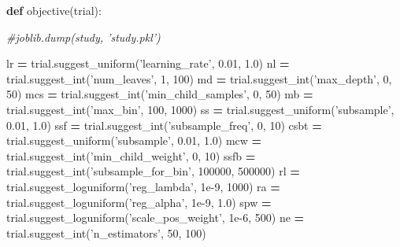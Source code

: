 \documentclass[]{book}
\newenvironment{Shaded}{\begin{snugshade}}{\end{snugshade}}
\newcommand{\CommentTok}[1]{\textcolor[rgb]{0.56,0.35,0.01}{\textit{#1}}}
\newcommand{\DecValTok}[1]{\textcolor[rgb]{0.00,0.00,0.81}{#1}}
\newcommand{\FloatTok}[1]{\textcolor[rgb]{0.00,0.00,0.81}{#1}}
\newcommand{\KeywordTok}[1]{\textcolor[rgb]{0.13,0.29,0.53}{\textbf{#1}}}
\newcommand{\NormalTok}[1]{#1}
\newcommand{\OperatorTok}[1]{\textcolor[rgb]{0.81,0.36,0.00}{\textbf{#1}}}
\newcommand{\StringTok}[1]{\textcolor[rgb]{0.31,0.60,0.02}{#1}}
\begin{document}
\begin{Shaded}
\begin{Highlighting}[]
\KeywordTok{def}\NormalTok{ objective(trial):    }
    
    \CommentTok{#joblib.dump(study, 'study.pkl')}
    
\NormalTok{    lr }\OperatorTok{=}\NormalTok{ trial.suggest_uniform(}\StringTok{'learning_rate'}\NormalTok{, }\FloatTok{0.01}\NormalTok{, }\FloatTok{1.0}\NormalTok{)}
\NormalTok{    nl }\OperatorTok{=}\NormalTok{ trial.suggest_int(}\StringTok{'num_leaves'}\NormalTok{, }\DecValTok{1}\NormalTok{, }\DecValTok{100}\NormalTok{) }
\NormalTok{    md }\OperatorTok{=}\NormalTok{ trial.suggest_int(}\StringTok{'max_depth'}\NormalTok{, }\DecValTok{0}\NormalTok{, }\DecValTok{50}\NormalTok{) }
\NormalTok{    mcs }\OperatorTok{=}\NormalTok{ trial.suggest_int(}\StringTok{'min_child_samples'}\NormalTok{, }\DecValTok{0}\NormalTok{, }\DecValTok{50}\NormalTok{) }
\NormalTok{    mb }\OperatorTok{=}\NormalTok{ trial.suggest_int(}\StringTok{'max_bin'}\NormalTok{, }\DecValTok{100}\NormalTok{, }\DecValTok{1000}\NormalTok{) }
\NormalTok{    ss }\OperatorTok{=}\NormalTok{ trial.suggest_uniform(}\StringTok{'subsample'}\NormalTok{, }\FloatTok{0.01}\NormalTok{, }\FloatTok{1.0}\NormalTok{)}
\NormalTok{    ssf }\OperatorTok{=}\NormalTok{ trial.suggest_int(}\StringTok{'subsample_freq'}\NormalTok{, }\DecValTok{0}\NormalTok{, }\DecValTok{10}\NormalTok{) }
\NormalTok{    csbt }\OperatorTok{=}\NormalTok{ trial.suggest_uniform(}\StringTok{'subsample'}\NormalTok{, }\FloatTok{0.01}\NormalTok{, }\FloatTok{1.0}\NormalTok{)}
\NormalTok{    mcw }\OperatorTok{=}\NormalTok{ trial.suggest_int(}\StringTok{'min_child_weight'}\NormalTok{, }\DecValTok{0}\NormalTok{, }\DecValTok{10}\NormalTok{) }
\NormalTok{    ssfb }\OperatorTok{=}\NormalTok{ trial.suggest_int(}\StringTok{'subsample_for_bin'}\NormalTok{, }\DecValTok{100000}\NormalTok{, }\DecValTok{500000}\NormalTok{) }
\NormalTok{    rl }\OperatorTok{=}\NormalTok{ trial.suggest_loguniform(}\StringTok{'reg_lambda'}\NormalTok{, }\FloatTok{1e-9}\NormalTok{, }\DecValTok{1000}\NormalTok{)}
\NormalTok{    ra }\OperatorTok{=}\NormalTok{ trial.suggest_loguniform(}\StringTok{'reg_alpha'}\NormalTok{, }\FloatTok{1e-9}\NormalTok{, }\FloatTok{1.0}\NormalTok{)}
\NormalTok{    spw }\OperatorTok{=}\NormalTok{ trial.suggest_loguniform(}\StringTok{'scale_pos_weight'}\NormalTok{, }\FloatTok{1e-6}\NormalTok{, }\DecValTok{500}\NormalTok{)}
\NormalTok{    ne }\OperatorTok{=}\NormalTok{ trial.suggest_int(}\StringTok{'n_estimators'}\NormalTok{, }\DecValTok{50}\NormalTok{, }\DecValTok{100}\NormalTok{)}
    

\end{Highlighting}
\end{Shaded}
\end{document}
